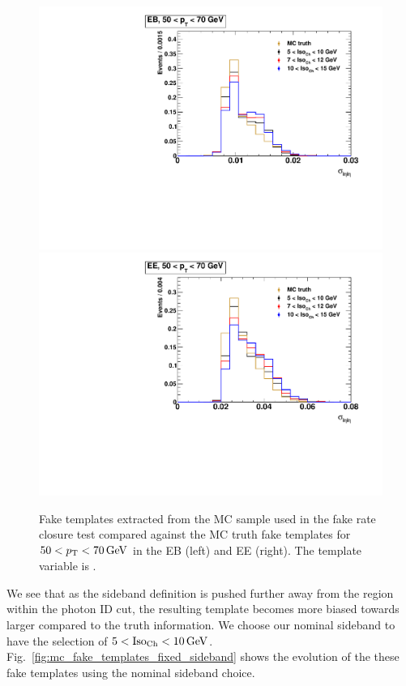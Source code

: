 \begin{figure}[!htbp]
  \centering
  \includegraphics[scale=0.40]{figures/closure_test_fake_template_sieie_EB_pt50To70_sample_all.pdf}
  \includegraphics[scale=0.40]{figures/closure_test_fake_template_sieie_EE_pt50To70_sample_all.pdf}
  \caption{Fake templates extracted from the MC sample used in the fake rate closure test compared against the MC truth fake templates for $50 < p_{\mathrm{T}} < 70\,\text{Ge\hspace{-.08em}V}$ in the EB (left) and EE (right). The template variable is \sieie.}
  \label{fig:mc_fake_templates_fixed_pt}
\end{figure}

We see that as the sideband definition is pushed further away from the region within the photon ID cut, the resulting template becomes more biased towards larger \sieie compared to the truth information. We choose our nominal sideband to have the selection of $5 < \text{Iso}_{\text{Ch}} < 10\,\text{Ge\hspace{-.08em}V}$. Fig.~\ref{fig:mc_fake_templates_fixed_sideband} shows the \pt evolution of the these fake templates using the nominal \chiso sideband choice.


